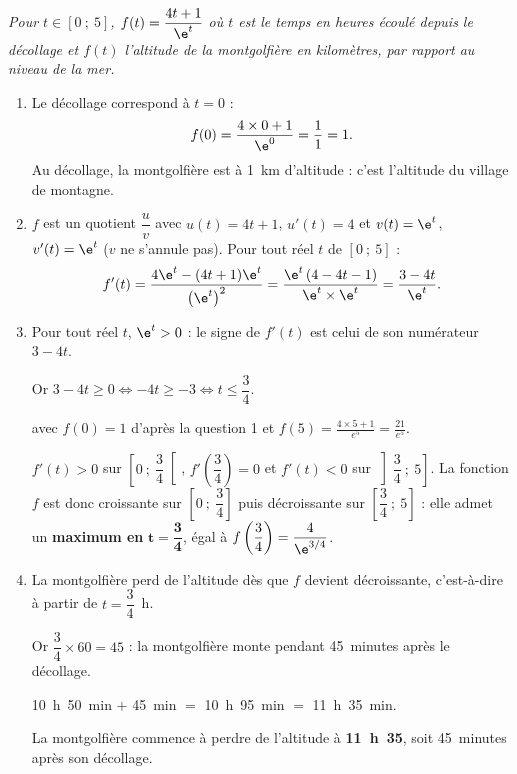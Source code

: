 \emph{Pour $t \in [0~;~5]$, $f(t) = \dfrac{4t+1}{\e^t}$ où $t$ est le temps en heures écoulé
depuis le décollage et $f(t)$ l'altitude de la montgolfière en kilomètres, par rapport au
niveau de la mer.}

\begin{enumerate}
	\item Le décollage correspond à $t = 0$ :
	\[f(0) = \dfrac{4 \times 0 + 1}{\e^0} = \dfrac{1}{1} = 1.\]
	Au décollage, la montgolfière est à 1~km d'altitude : c'est l'altitude du village de
	montagne.

	\item $f$ est un quotient $\dfrac{u}{v}$ avec $u(t) = 4t + 1$, $u'(t) = 4$ et $v(t) = \e^t$, $v'(t) = \e^t$
	($v$ ne s'annule pas). Pour tout réel $t$ de $[0~;~5]$ :
	\[f'(t) = \dfrac{4\e^t - (4t+1)\e^t}{\left(\e^t\right)^2}
	= \dfrac{\e^t\left(4 - 4t - 1\right)}{\e^t \times \e^t}
	= \dfrac{3 - 4t}{\e^t}.\]

	\item Pour tout réel $t$, $\e^t > 0$ : le signe de $f'(t)$ est celui de son numérateur $3 - 4t$.

	Or $3 - 4t \geqslant 0 \iff -4t \geqslant -3 \iff t \leqslant \dfrac{3}{4}$.

	\begin{center}
	\end{center}

avec $f(0)=1$ d'après la question 1 et $f(5)=\frac{4\times 5 + 1}{e^5} = \frac{21}{e^5}$.

	$f'(t) > 0$ sur $\left[0~;~\dfrac{3}{4}\right[$, $f'\left(\dfrac{3}{4}\right) = 0$ et
	$f'(t) < 0$ sur $\left]\dfrac{3}{4}~;~5\right]$. La fonction $f$ est donc croissante sur
	$\left[0~;~\dfrac{3}{4}\right]$ puis décroissante sur $\left[\dfrac{3}{4}~;~5\right]$ : elle
	admet un \textbf{maximum en} $\boldsymbol{t = \dfrac{3}{4}}$, égal à
	$f\left(\dfrac{3}{4}\right) = \dfrac{4}{\e^{3/4}}$.

	\item La montgolfière perd de l'altitude dès que $f$ devient décroissante, c'est-à-dire à partir de $t = \dfrac{3}{4}$~h.
	
Or $\dfrac{3}{4} \times 60 = 45$ : la montgolfière monte pendant 45~minutes après le
	décollage.

10~h~50~min $+$ 45~min $=$ 10~h~95~min $=$ 11~h~35~min.

La montgolfière commence à perdre de l'altitude à \textbf{11~h~35}, soit 45~minutes
	après son décollage.
\end{enumerate}
